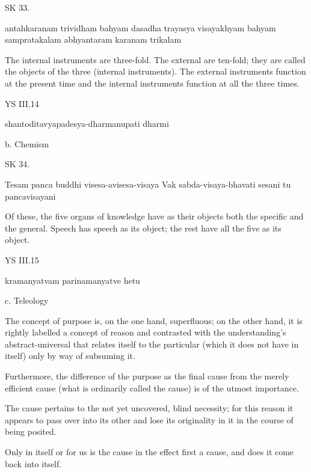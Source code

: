 SK 33.

antahkaranam trividham bahyam dasadha trayasya visayakhyam
bahyam sampratakalam abhyantaram karanam trikalam

The internal instruments are three-fold.
The external are ten-fold; they are called the objects of the three (internal instruments).
The external instruments function at the present time and
the internal instruments function at all the three times.

YS III.14

shantoditavyapadesya-dharmanupati dharmi

b. Chemism

SK 34.

Tesam panca buddhi visesa-avisesa-visaya
Vak sabda-visaya-bhavati sesani tu pancavisayani

Of these, the five organs of knowledge have as their objects
both the specific and the general.
Speech has speech as its object;
the rest have all the five as its object.

YS III.15

kramanyatvam parinamanyatve hetu

c. Teleology

The concept of purpose is, on the one hand, superfluous;
on the other hand, it is rightly labelled a concept of reason and
contrasted with the understanding's abstract-universal that
relates itself to the particular (which it does not have in itself)
only by way of subsuming it.

Furthermore, the difference of the purpose as the final cause
from the merely efficient cause (what is ordinarily called the cause)
is of the utmost importance.

The cause pertains to the not yet uncovered, blind necessity;
for this reason it appears to pass over into its other and
lose its originality in it in the course of being posited.

Only in itself or for us is the cause in the effect first a cause,
and does it come back into itself.


